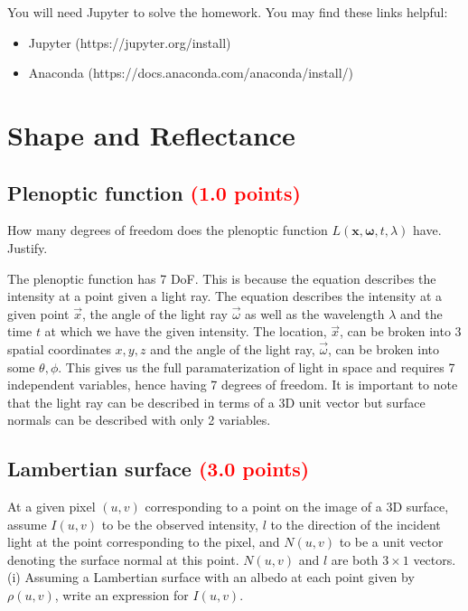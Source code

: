\documentclass[answers]{exam}
\newcommand{\mypoints}[1]{\textcolor{red}{(#1 points)}}
\begin{document}
You will need Jupyter to solve the homework. 
You may find these links helpful: 
\begin{itemize}
    \item Jupyter (https://jupyter.org/install)
    \item Anaconda (https://docs.anaconda.com/anaconda/install/)
\end{itemize}

\newpage
\section{Shape and Reflectance}
\label{sec:Shape and reflectance}
\subsection{Plenoptic function \mypoints{1.0}}
How many degrees of freedom does the plenoptic function $L(\boldsymbol{x}, \boldsymbol{\omega}, t, \lambda)$ have. Justify.
\begin{solution}
The plenoptic function has 7 DoF. This is because the equation describes the intensity at a point given a light ray. The equation describes the intensity at a given point $\vec{x}$, the angle of the light ray $\vec{\omega}$ as well as the wavelength $\lambda$ and the time $t$ at which we have the given intensity. The location, $\vec{x}$, can be broken into 3 spatial coordinates $x, y, z$ and the angle of the light ray, $\vec{\omega}$, can be broken into some $\theta, \phi$.  This gives us the full paramaterization of light in space and requires 7 independent variables, hence having 7 degrees of freedom. It is important to note that the light ray can be described in terms of a 3D unit vector but surface normals can be described with only 2 variables.
\end{solution}

\subsection{Lambertian surface \mypoints{3.0}}
At a given pixel $(u, v)$ corresponding to a point on the image of a 3D surface, assume $I(u,v)$ to be the observed intensity, $l$ to the direction of the incident light at the point corresponding to the pixel, and $N(u,v)$ to be a unit vector denoting the surface normal at this point. $N(u,v)$ and $l$ are both $3 \times 1$ vectors. \\    

(i) Assuming a Lambertian surface with an albedo at each point given by $\rho(u,v)$, write an expression for $I(u,v)$. \\
\end{document}
